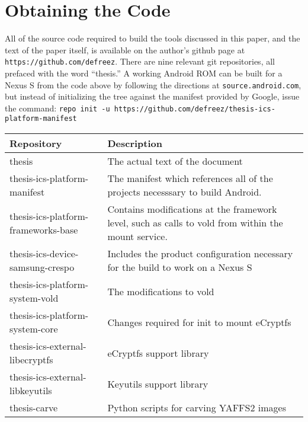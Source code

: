 \chapter{Obtaining the Code}
\label{app:obtaincode}

All of the source code required to build the tools discussed in this paper, and the text of the paper itself,  is available on the author's github page at
\texttt{https://github.com/defreez}. There are nine relevant git repositories, all prefaced with the word ``thesis.''
A working Android ROM can be built for a Nexus S from the code above by following the directions at \texttt{source.android.com}, but
instead of initializing the tree against the manifest provided by Google, issue the command: 
\texttt{repo init -u https://github.com/defreez/thesis-ics-platform-manifest}

\begin{table}[!h]
\centering
\begin{tabular}{| l | p{3.2in} |}
\hline
\textbf{Repository} & \textbf{Description} \\
\hline
thesis &  The actual text of the document \\
\hline
thesis-ics-platform-manifest & The manifest which references all of the projects necesssary to build Android. \\
\hline
thesis-ics-platform-frameworks-base & Contains modifications at the framework level, such as calls to vold from within the
mount service. \\
\hline
thesis-ics-device-samsung-crespo & Includes the product configuration necessary for the build to work on a Nexus S \\
\hline
thesis-ics-platform-system-vold & The modifications to vold \\
\hline
thesis-ics-platform-system-core & Changes required for init to mount eCryptfs \\
\hline
thesis-ics-external-libecryptfs & eCryptfs support library \\
\hline
thesis-ics-external-libkeyutils & Keyutils support library \\
\hline
thesis-carve & Python scripts for carving YAFFS2 images \\
\hline
\end{tabular}
\end{table}
